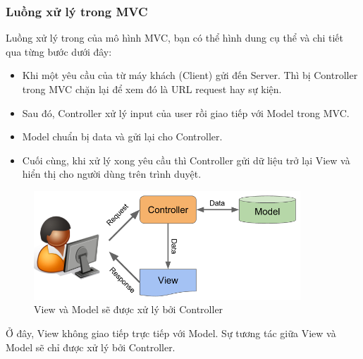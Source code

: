 \subsubsection{Luồng xử lý trong MVC}
Luồng xử lý trong của mô hình MVC, bạn có thể hình dung cụ thể và chi tiết qua từng bước dưới đây:
\begin{itemize}
    \item Khi một yêu cầu của từ máy khách (Client) gửi đến Server. Thì bị Controller trong MVC chặn lại để xem đó là URL request hay sự kiện.
    \item Sau đó, Controller xử lý input của user rồi giao tiếp với Model trong MVC.
    \item Model chuẩn bị data và gửi lại cho Controller.
    \item Cuối cùng, khi xử lý xong yêu cầu thì Controller gửi dữ liệu trở lại View và hiển thị cho người dùng trên trình duyệt.
\end{itemize}
\begin{figure}[H]
    \centering
    \includegraphics[width=10cm]{Images/luongmvc.png}
    \vspace{0.5cm}
    \caption{View và Model sẽ được xử lý bởi Controller}
    \label{fig:my_label}
\end{figure}

Ở đây, View không giao tiếp trực tiếp với Model. Sự tương tác giữa View và Model sẽ chỉ được xử lý bởi Controller.